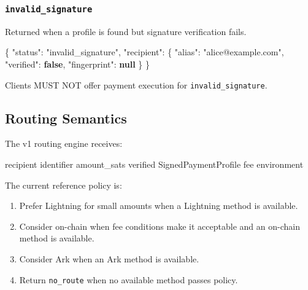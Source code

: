 \documentclass[
]{article}
\newenvironment{Shaded}{}{}
\newcommand{\DataTypeTok}[1]{\textcolor[rgb]{0.56,0.13,0.00}{#1}}
\newcommand{\FunctionTok}[1]{\textcolor[rgb]{0.02,0.16,0.49}{#1}}
\newcommand{\KeywordTok}[1]{\textcolor[rgb]{0.00,0.44,0.13}{\textbf{#1}}}
\newcommand{\NormalTok}[1]{#1}
\newcommand{\StringTok}[1]{\textcolor[rgb]{0.25,0.44,0.63}{#1}}
\providecommand{\tightlist}{%
  \setlength{\itemsep}{0pt}\setlength{\parskip}{0pt}}
\begin{document}
\hypertarget{invalid_signature}{%
\subsubsection{\texorpdfstring{\texttt{invalid\_signature}}{invalid\_signature}}\label{invalid_signature}}

Returned when a profile is found but signature verification fails.

\begin{Shaded}
\begin{Highlighting}[]
\FunctionTok{\{}
  \DataTypeTok{"status"}\FunctionTok{:} \StringTok{"invalid\_signature"}\FunctionTok{,}
  \DataTypeTok{"recipient"}\FunctionTok{:} \FunctionTok{\{}
    \DataTypeTok{"alias"}\FunctionTok{:} \StringTok{"alice@example.com"}\FunctionTok{,}
    \DataTypeTok{"verified"}\FunctionTok{:} \KeywordTok{false}\FunctionTok{,}
    \DataTypeTok{"fingerprint"}\FunctionTok{:} \KeywordTok{null}
  \FunctionTok{\}}
\FunctionTok{\}}
\end{Highlighting}
\end{Shaded}

Clients MUST NOT offer payment execution for
\texttt{invalid\_signature}.

\hypertarget{routing-semantics}{%
\subsection{Routing Semantics}\label{routing-semantics}}

The v1 routing engine receives:

\begin{Shaded}
\begin{Highlighting}[]
\NormalTok{recipient identifier}
\NormalTok{amount\_sats}
\NormalTok{verified SignedPaymentProfile}
\NormalTok{fee environment}
\end{Highlighting}
\end{Shaded}

The current reference policy is:

\begin{enumerate}
\def\labelenumi{\arabic{enumi}.}
\tightlist
\item
  Prefer Lightning for small amounts when a Lightning method is
  available.
\item
  Consider on-chain when fee conditions make it acceptable and an
  on-chain method is available.
\item
  Consider Ark when an Ark method is available.
\item
  Return \texttt{no\_route} when no available method passes policy.
\end{enumerate}
\end{document}
